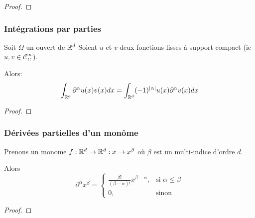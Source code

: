 \ifdefined\outputproof
\begin{proof}

\end{proof}
\fi

\subsubsection{Intégrations par parties}

\begin{proposition}
	Soit $\Omega$ un ouvert de $\mathbb{R}^{d}$
	Soient $u$ et $v$ deux fonctions lisses à support compact (ie $u, v \in
	\mathcal{C}_{C}^{\infty}$).

	Alors:
	\begin{equation*}
		\int_{\mathbb{R}^{d}} \partial^{\alpha} u(x) v(x) dx = \int_{\mathbb{R}^{d}}
		(-1)^{|\alpha|} u(x) \partial^{\alpha}v(x) dx
	\end{equation*}
\end{proposition}

\ifdefined\outputproof
\begin{proof}

\end{proof}
\fi

\subsubsection{Dérivées partielles d'un monôme}

\begin{proposition}
	Prenons un monome $f : \mathbb{R}^{d} \rightarrow \mathbb{R}^{d} : x \rightarrow
	x^{\beta}$ où $\beta$ est un multi-indice d'ordre $d$.

	Alors
	\begin{equation*}
		\partial^{\alpha} x^{\beta} =
		\begin{cases}
			\displaystyle \frac{\beta!}{(\beta - \alpha)!} x^{\beta - \alpha}, &
			\mbox{si } \alpha
			\leq \beta \\
			0, & \mbox{sinon}
		\end{cases}
	\end{equation*}
\end{proposition}

\ifdefined\outputproof
\begin{proof}

\end{proof}
\fi
